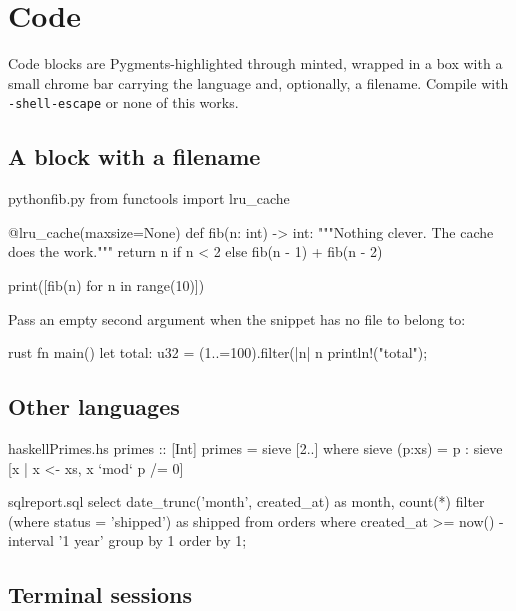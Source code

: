 \chapter{Code}

Code blocks are Pygments-highlighted through minted, wrapped in a box with a
small chrome bar carrying the language and, optionally, a filename. Compile
with \texttt{-shell-escape} or none of this works.

\section{A block with a filename}

\begin{code}{python}{fib.py}
from functools import lru_cache

@lru_cache(maxsize=None)
def fib(n: int) -> int:
    """Nothing clever. The cache does the work."""
    return n if n < 2 else fib(n - 1) + fib(n - 2)

print([fib(n) for n in range(10)])
\end{code}

Pass an empty second argument when the snippet has no file to belong to:

\begin{code}{rust}{}
fn main() {
    let total: u32 = (1..=100).filter(|n| n %
    println!("{total}");
}
\end{code}

\section{Other languages}

\begin{code}{haskell}{Primes.hs}
primes :: [Int]
primes = sieve [2..]
  where sieve (p:xs) = p : sieve [x | x <- xs, x `mod` p /= 0]
\end{code}

\begin{code}{sql}{report.sql}
select
  date_trunc('month', created_at) as month,
  count(*) filter (where status = 'shipped') as shipped
from orders
where created_at >= now() - interval '1 year'
group by 1
order by 1;
\end{code}

\section{Terminal sessions}

